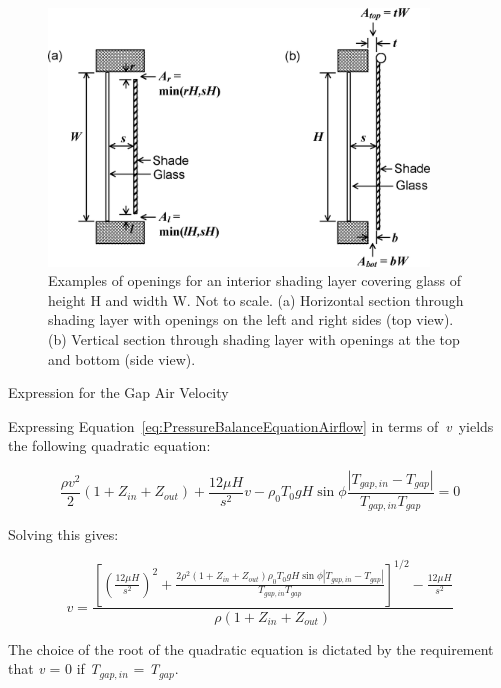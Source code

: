 \begin{figure}[hbtp] %
\centering
\includegraphics[width=0.9\textwidth, height=0.9\textheight, keepaspectratio=true]{media/image1679.png}
\caption{Examples of openings for an interior shading layer covering glass of height H and width W. Not to scale. (a) Horizontal section through shading layer with openings on the left and right sides (top view). (b) Vertical section through shading layer with openings at the top and bottom (side view). \protect \label{fig:examples-of-openings-for-an-interior-shading}}
\end{figure}

Expression for the Gap Air Velocity

Expressing Equation~\ref{eq:PressureBalanceEquationAirflow} in terms of~\emph{v}~yields the following quadratic equation:

\begin{equation}
\frac{{\rho {v^2}}}{2}\left( {1 + {Z_{in}} + {Z_{out}}} \right) + \frac{{12\mu H}}{{{s^2}}}v - {\rho_0}{T_0}gH\sin \phi \frac{{\left| {{T_{gap,in}} - {T_{gap}}} \right|}}{{{T_{gap,in}}{T_{gap}}}} = 0
\end{equation}

Solving this gives:

\begin{equation}
v = \frac{{{{\left[ {{{\left( {\frac{{12\mu H}}{{{s^2}}}} \right)}^2} + \frac{{2{\rho ^2}(1 + {Z_{in}} + {Z_{out}}){\rho_0}{T_0}gH\sin \phi \left| {{T_{gap,in}} - {T_{gap}}} \right|}}{{{T_{gap,in}}{T_{gap}}}}} \right]}^{1/2}} - \frac{{12\mu H}}{{{s^2}}}}}{{\rho (1 + {Z_{in}} + {Z_{out}})}}
\label{eq:GapAirVelocityEquation}
\end{equation}

The choice of the root of the quadratic equation is dictated by the requirement that \emph{v} = 0 if \emph{T\(_{gap,in}\)} = \emph{T\(_{gap}\)}.

